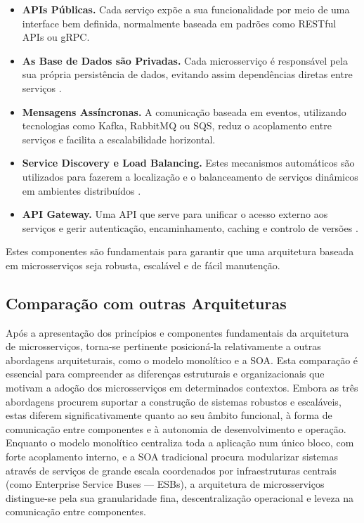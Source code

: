 \begin{itemize}
    \item \textbf{APIs Públicas.} Cada serviço expõe a sua funcionalidade por meio de uma interface bem definida, normalmente baseada em padrões como RESTful APIs ou gRPC.

    \item \textbf{As Base de Dados são Privadas.} Cada microsserviço é responsável pela sua própria persistência de dados, evitando assim dependências diretas entre serviços \cite{Dragoni2017}.

    \item \textbf{Mensagens Assíncronas.} A comunicação baseada em eventos, utilizando tecnologias como Kafka, RabbitMQ ou SQS, reduz o acoplamento entre serviços e facilita a escalabilidade horizontal.

    \item \textbf{Service Discovery e Load Balancing.} Estes mecanismos automáticos são utilizados para fazerem a localização e o balanceamento de serviços dinâmicos em ambientes distribuídos \cite{Newman2015}.

    \item \textbf{API Gateway.} Uma API que serve para unificar o acesso externo aos serviços e gerir autenticação, encaminhamento, caching e controlo de versões \cite{Richardson2018}.
\end{itemize}


Estes componentes são fundamentais para garantir que uma arquitetura baseada em microsserviços seja robusta, escalável e de fácil manutenção.

\subsection{Comparação com outras Arquiteturas}

Após a apresentação dos princípios e componentes fundamentais da arquitetura de microsserviços, torna-se pertinente posicioná-la relativamente a outras abordagens arquiteturais, como o modelo monolítico e a SOA. Esta comparação é essencial para compreender as diferenças estruturais e organizacionais que motivam a adoção dos microsserviços em determinados contextos. Embora as três abordagens procurem suportar a construção de sistemas robustos e escaláveis, estas diferem significativamente quanto ao seu âmbito funcional, à forma de comunicação entre componentes e à autonomia de desenvolvimento e operação. Enquanto o modelo monolítico centraliza toda a aplicação num único bloco, com forte acoplamento interno, e a SOA tradicional procura modularizar sistemas através de serviços de grande escala coordenados por infraestruturas centrais (como Enterprise Service Buses — ESBs), a arquitetura de microsserviços distingue-se pela sua granularidade fina, descentralização operacional e leveza na comunicação entre componentes.

